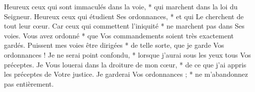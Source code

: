 Heureux ceux qui sont immaculés dans la voie, * qui marchent dans la loi du Seigneur.
\versseparator
Heureux ceux qui étudient Ses ordonnances, * et qui Le cherchent de tout leur cœur.
\versseparator
Car ceux qui commettent l'iniquité * ne marchent pas dans Ses voies.
\versseparator
Vous avez ordonné * que Vos commandements soient très exactement gardés.
\versseparator
Puissent mes voies être dirigées * de telle sorte, que je garde Vos ordonnances !
\versseparator
Je ne serai point confondu, * lorsque j'aurai sous les yeux tous Vos préceptes.
\versseparator
Je Vous louerai dans la droiture de mon cœur, * de ce que j'ai appris les préceptes de Votre justice.
\versseparator
Je garderai Vos ordonnances ; * ne m'abandonnez pas entièrement.
